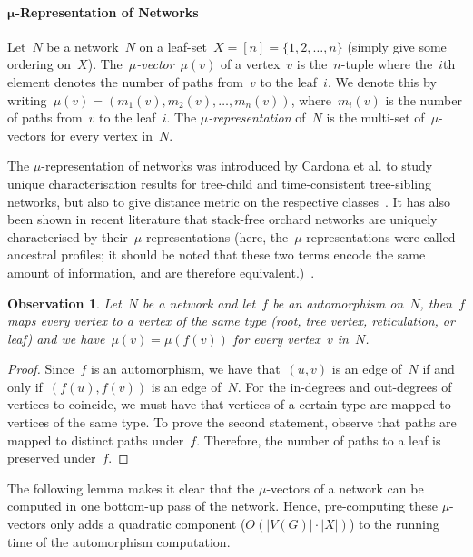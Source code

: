 \documentclass{article}
\newtheorem{observation}{Observation}
\theoremstyle{definition}
\begin{document}
\paragraph{$\bm{\mu}$-Representation of Networks}

Let~$N$ be a network~$N$ on a leaf-set~$X = [n] = \{1,2,\ldots,n\}$ (simply give some ordering on~$X$).
The~\emph{$\mu$-vector}~$\mu(v)$ of a vertex~$v$ is the~$n$-tuple where the~$i$th element denotes the number of paths from~$v$ to the leaf~$i$.
We denote this by writing~$\mu(v) = (m_1(v), m_2(v), \ldots, m_n(v))$, where~$m_i(v)$ is the number of paths from~$v$ to the leaf~$i$.
The \emph{$\mu$-representation} of~$N$ is the multi-set of~$\mu$-vectors for every vertex in~$N$.

The $\mu$-representation of networks was introduced by Cardona et al. to study unique characterisation results for tree-child and time-consistent tree-sibling networks, but also to give distance metric on the respective classes~\cite{cardona2008distance,cardona2009comparison}.
It has also been shown in recent literature that stack-free orchard networks are uniquely characterised by their~$\mu$-representations (here, the~$\mu$-representations were called ancestral profiles; it should be noted that these two terms encode the same amount of information, and are therefore equivalent.)~\cite{erdHos2019class,bai2021defining}.

\begin{observation}\label{obs:AutSameMu}
Let~$N$ be a network and let~$f$ be an automorphism on~$N$, then~$f$ maps every vertex to a vertex of the same type (root, tree vertex, reticulation, or leaf) and we have~$\mu(v) = \mu(f(v))$ for every vertex~$v$ in~$N$.
\end{observation}
\begin{proof}
Since~$f$ is an automorphism, we have that~$(u,v)$ is an edge of~$N$ if and only if~$(f(u),f(v))$ is an edge of~$N$.
For the in-degrees and out-degrees of vertices to coincide, we must have that vertices of a certain type are mapped to vertices of the same type.
To prove the second statement, observe that paths are mapped to distinct paths under~$f$.
Therefore, the number of paths to a leaf is preserved under~$f$.
\end{proof}

The following lemma makes it clear that the $\mu$-vectors of a network can be computed in one bottom-up pass of the network. Hence, pre-computing these $\mu$-vectors only adds a quadratic component ($O(|V(G)|\cdot |X|)$) to the running time of the automorphism computation.
\end{document}
